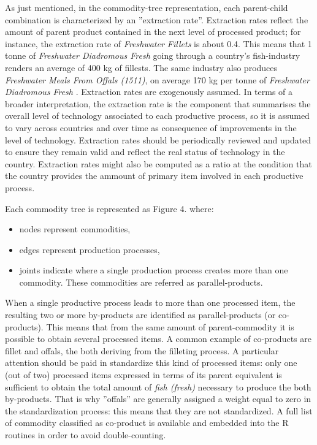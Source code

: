 \documentclass[nojss]{jss}
\begin{document}
As just mentioned, in the commodity-tree representation, each parent-child combination is characterized by an ''extraction rate''. Extraction rates reflect the amount of parent product contained in the next level of processed product; for instance, the extraction rate of \textit{Freshwater Fillets}  is about 0.4. This means that 1 tonne of \textit{Freshwater Diadromous Fresh } going through a country's fish-industry renders an average of 400 kg of fillests. The same industry also produces \textit{Freshwater Meals From Offals (1511)}, on average 170 kg per tonne of \textit{Freshwater Diadromous Fresh }. Extraction rates are exogenously assumed. In terms of a broader interpretation, the extraction rate is the component that summarises the overall level of technology associated to each productive process, so it is assumed to vary across countries and over time as consequence of improvements in the level of technology. Extraction rates should be periodically reviewed and updated to ensure they remain valid and reflect the real status of technology in the country. Extraction rates might also be computed as a ratio at the condition that the country provides the ammount of primary item involved in each productive process.

Each commodity tree is represented as Figure 4. where:
\begin{itemize}
\item	nodes represent commodities,
\item	edges represent production processes,
\item	joints indicate where a single production process creates more than one commodity. These commodities are referred as parallel-products.
\end{itemize}
When a single productive process leads to more than one processed item, the resulting two or more by-products are identified as parallel-products (or co-products). This means that from the same amount of parent-commodity it is possible to obtain several processed items. A common example of co-products are fillet and offals, the both deriving from the filleting process. A particular attention should be paid in standardize this kind of processed items: only one (out of two) processed items expressed in terms of its parent equivalent is sufficient to obtain the total amount of \textit{fish (fresh)} necessary to produce the both by-products. That is why  ''offals'' are generally assigned a weight equal to zero in the standardization process: this means that they are not standardized. A full list of commodity classified as co-product is available and embedded into the R routines in order to avoid double-counting.
\end{document}
